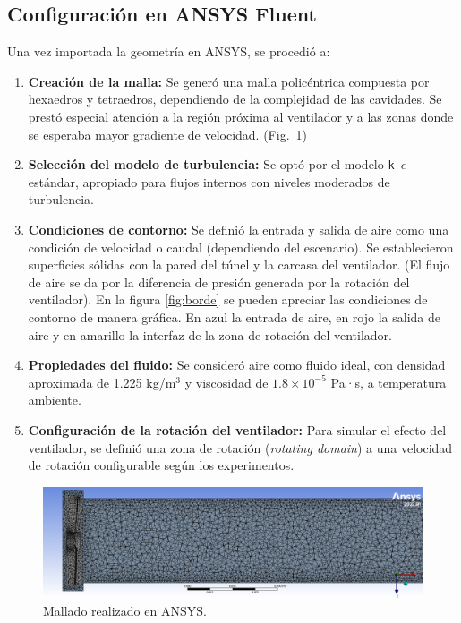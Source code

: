 \subsection{Configuración en ANSYS Fluent}
Una vez importada la geometría en ANSYS, se procedió a:
\begin{enumerate}
    \item \textbf{Creación de la malla:} Se generó una malla policéntrica compuesta por hexaedros y tetraedros, dependiendo de la complejidad de las cavidades. Se prestó especial atención a la región próxima al ventilador y a las zonas donde se esperaba mayor gradiente de velocidad. (Fig.~\ref{fig:mesh})
    \item \textbf{Selección del modelo de turbulencia:} Se optó por el modelo \texttt{k-$\epsilon$} estándar, apropiado para flujos internos con niveles moderados de turbulencia. 
    \item \textbf{Condiciones de contorno:} Se definió la entrada y salida de aire como una condición de velocidad o caudal (dependiendo del escenario). Se establecieron superficies sólidas con la pared del túnel y la carcasa del ventilador. (El flujo de aire se da por la diferencia de presión generada por la rotación del ventilador). En la figura \ref{fig:borde} se pueden apreciar las condiciones de contorno de manera gráfica. En azul la entrada de aire, en rojo la salida de aire y en amarillo la interfaz de la zona de rotación del ventilador.
    \item \textbf{Propiedades del fluido:} Se consideró aire como fluido ideal, con densidad aproximada de 1.225 kg/m$^3$ y viscosidad de $1.8 \times 10^{-5}$ Pa·s, a temperatura ambiente.
    \item \textbf{Configuración de la rotación del ventilador:} Para simular el efecto del ventilador, se definió una zona de rotación (\textit{rotating domain}) a una velocidad de rotación configurable según los experimentos.
\end{enumerate}

\begin{figure}[!ht]
    \centering
    \includegraphics[width=0.7\linewidth]{images/mesh.png}
    \caption{Mallado realizado en ANSYS.}
    \label{fig:mesh}
\end{figure}


